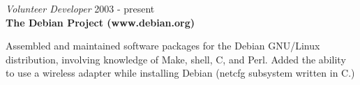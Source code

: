 \documentclass[overlapped,line,margin]{res}
\begin{document}
\begin{resume}
{\sl Volunteer Developer} \hfill 2003 - present \\
\textbf{The Debian Project (www.debian.org)}

  Assembled and maintained software packages for the Debian GNU/Linux
  distribution, involving knowledge of Make, shell, C, and Perl. Added
  the ability to use a wireless adapter while installing Debian (netcfg
  subsystem written in C.)

\end{resume}
\end{document}
